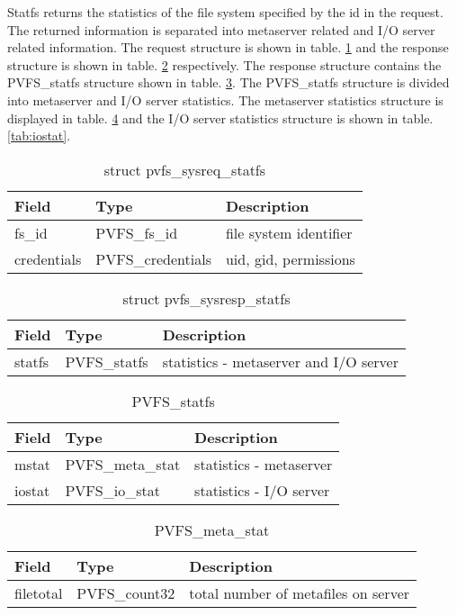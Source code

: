 \documentclass[11pt, letterpaper]{article}
\begin{document}
Statfs returns the statistics of the file system specified by the id in
the request. The returned information is separated into metaserver related
and I/O server related information. The request structure is shown in
table. \ref{tab:reqstatfs} and the response structure is shown in table.
\ref{tab:respstatfs} respectively. The response structure contains the
PVFS\_statfs structure shown in table. \ref{tab:statfs}. The PVFS\_statfs
structure is divided into metaserver and I/O server statistics. The
metaserver statistics structure is displayed in table. \ref{tab:metastat}
and the I/O server statistics structure is shown in table. \ref{tab:iostat}.

\begin{table}[H]
\begin{tabular}{|l|l|l|}
\hline
Field & Type & Description \\
\hline
\hline
fs\_id & PVFS\_fs\_id & file system identifier \\
\hline
credentials & PVFS\_credentials & uid, gid, permissions \\
\hline
\end{tabular}
\caption{struct pvfs\_sysreq\_statfs}\label{tab:reqstatfs}
\end{table}

\begin{table}[H]
\begin{tabular}{|l|l|l|}
\hline
Field & Type & Description \\
\hline
\hline
statfs & PVFS\_statfs & statistics - metaserver and I/O server\\
\hline
\end{tabular}
\caption{struct pvfs\_sysresp\_statfs}\label{tab:respstatfs}
\end{table}

\begin{table}[H]
\begin{tabular}{|l|l|l|}
\hline
Field & Type & Description \\
\hline
\hline
mstat & PVFS\_meta\_stat & statistics - metaserver \\
\hline
iostat & PVFS\_io\_stat & statistics - I/O server \\
\hline
\end{tabular}
\caption{PVFS\_statfs}\label{tab:statfs}
\end{table}

\begin{table}[H]
\begin{tabular}{|l|l|l|}
\hline
Field & Type & Description \\
\hline
\hline
filetotal & PVFS\_count32 & total number of metafiles on server \\
\hline
\end{tabular}
\caption{PVFS\_meta\_stat}\label{tab:metastat}
\end{table}
\end{document}
